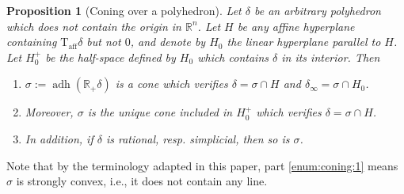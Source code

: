 \documentclass[11pt]{amsart}
\newtheorem{prop}[thm]{Proposition}
\theoremstyle{definition}
\numberwithin{equation}{section}
\renewcommand{\~}{\widetilde}
\newcommand{\R}{\mathbb{R}}
\newcommand{\Tan}{\mathrm{T}_{\!\scriptscriptstyle\mathrm{aff}}} %
\DeclareMathOperator{\adhop}{adh}
\newcommand{\adh}[1]{\adhop(#1)} %
\begin{document}
\begin{prop}[Coning over a polyhedron] \label{prop:cone_polyedre}
Let $\delta$ be an arbitrary polyhedron which does not contain the origin in $\R^n$. Let $H$ be any affine hyperplane containing $\Tan\delta$ but not $0$, and denote by $H_0$ the linear hyperplane parallel to $H$. Let $H_0^+$ be the half-space defined by $H_0$ which contains $\delta$ in its interior. Then
\begin{enumerate}
\item\label{enum:coning:1} $\sigma:=\adh{\R_+\delta}$ is a cone which verifies $\delta=\sigma\cap H$ and $\delta_\infty=\sigma\cap H_0$.
\item\label{enum:coning:2} Moreover, $\sigma$ is the unique cone included in $H_0^+$ which verifies $\delta=\sigma\cap H$.
\item\label{enum:coning:3} In addition, if $\delta$ is rational, resp. simplicial, then so is $\sigma$.
\end{enumerate}
\end{prop}
Note that by the terminology adapted in this paper, part \ref{enum:coning:1} means $\sigma$ is strongly convex, i.e., it does not contain any line.
\end{document}
